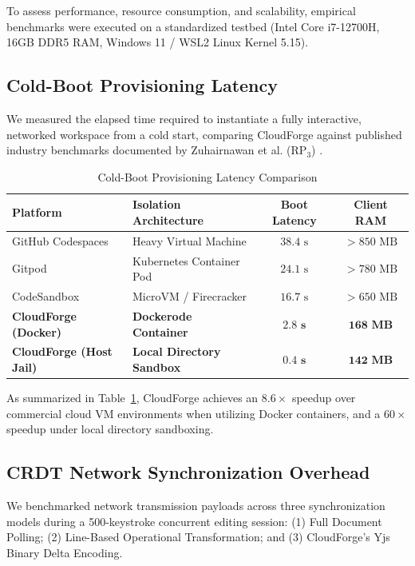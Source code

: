 \documentclass[conference]{IEEEtran}
\begin{document}
To assess performance, resource consumption, and scalability, empirical benchmarks were executed on a standardized testbed (Intel Core i7-12700H, 16GB DDR5 RAM, Windows 11 / WSL2 Linux Kernel 5.15).

\subsection{Cold-Boot Provisioning Latency}
We measured the elapsed time required to instantiate a fully interactive, networked workspace from a cold start, comparing CloudForge against published industry benchmarks documented by Zuhairnawan et al. ($\text{RP}_3$) \cite{rp3}.

\begin{table}[htbp]
\centering
\caption{Cold-Boot Provisioning Latency Comparison}
\label{tab:boot_benchmark}
\begin{tabular}{@{}llcc@{}}
\toprule
\textbf{Platform} & \textbf{Isolation Architecture} & \textbf{Boot Latency} & \textbf{Client RAM} \\
\midrule
GitHub Codespaces & Heavy Virtual Machine & $38.4\text{ s}$ & $>850\text{ MB}$ \\
Gitpod & Kubernetes Container Pod & $24.1\text{ s}$ & $>780\text{ MB}$ \\
CodeSandbox & MicroVM / Firecracker & $16.7\text{ s}$ & $>650\text{ MB}$ \\
\textbf{CloudForge (Docker)} & \textbf{Dockerode Container} & $\mathbf{2.8\text{ s}}$ & $\mathbf{168\text{ MB}}$ \\
\textbf{CloudForge (Host Jail)} & \textbf{Local Directory Sandbox} & $\mathbf{0.4\text{ s}}$ & $\mathbf{142\text{ MB}}$ \\
\bottomrule
\end{tabular}
\end{table}

As summarized in Table~\ref{tab:boot_benchmark}, CloudForge achieves an $8.6\times$ speedup over commercial cloud VM environments when utilizing Docker containers, and a $60\times$ speedup under local directory sandboxing.

\subsection{CRDT Network Synchronization Overhead}
We benchmarked network transmission payloads across three synchronization models during a 500-keystroke concurrent editing session: (1) Full Document Polling; (2) Line-Based Operational Transformation; and (3) CloudForge's Yjs Binary Delta Encoding.
\end{document}
